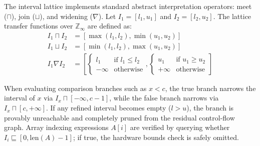The interval lattice implements standard abstract interpretation operators: meet ($\sqcap$), join ($\sqcup$), and widening ($\nabla$). Let $I_1 = [l_1, u_1]$ and $I_2 = [l_2, u_2]$. The lattice transfer functions over $\mathbb{Z}_\infty$ are defined as:
\begin{align}
I_1 \sqcap I_2 &= [\max(l_1, l_2), \min(u_1, u_2)] \\
I_1 \sqcup I_2 &= [\min(l_1, l_2), \max(u_1, u_2)] \\
I_1 \nabla I_2 &= \left[ \begin{cases} l_1 & \text{if } l_1 \le l_2 \\ -\infty & \text{otherwise} \end{cases}, \begin{cases} u_1 & \text{if } u_1 \ge u_2 \\ +\infty & \text{otherwise} \end{cases} \right]
\end{align}

When evaluating comparison branches such as $x < c$, the true branch narrows the interval of $x$ via $I_x \sqcap [-\infty, c - 1]$, while the false branch narrows via $I_x \sqcap [c, +\infty]$. If any refined interval becomes empty ($l > u$), the branch is provably unreachable and completely pruned from the residual control-flow graph. Array indexing expressions $A[i]$ are verified by querying whether $I_i \sqsubseteq [0, \mathrm{len}(A) - 1]$; if true, the hardware bounds check is safely omitted.
